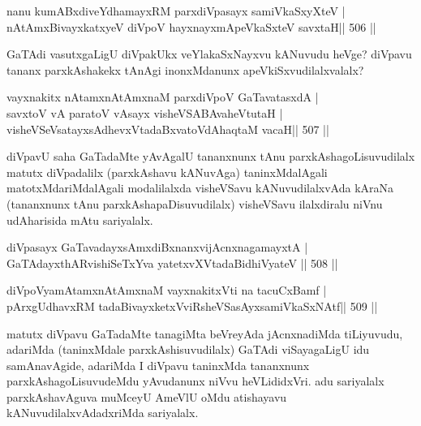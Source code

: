 \begin{shl}
nanu kumABxdiveYdhamayxRM parxdiVpasayx samiVkaSxyXteV | \\
nA\s \s tAmxBivayxkatxyeV diVpoV hayxnayxmApeVkaSxteV savxtaH\hfill ||  506 ||  
\end{shl}

\begin{artha}
GaTAdi  vasutxgaLigU diVpakUkx veYlakaSxNayxvu kANuvudu heVge? diVpavu tananx parxkAshakekx tAnAgi inonxMdanunx apeVkiSxvudilalxvalalx? 
\end{artha}


\begin{shl}
vayxnakitx nA\s \s tamxnA\s \s tAmxnaM parxdiVpoV GaTavatasxdA | \\
\footnotemark[1]savxtoV vA paratoV vA\s sayx visheVSABAvaheVtutaH | \\
visheVSeV\s satayxsAdhevxVtadaBxvatoVdAhaqtaM vacaH\hfill ||  507 ||  
\end{shl}

\begin{artha}
diVpavU saha GaTadaMte yAvAgalU tananxnunx tAnu parxkAshagoLisuvudilalx matutx diVpadalilx (parxkAshavu kANuvAga) taninxMdalAgali matotxMdariMdalAgali modalilalxda visheVSavu kANuvudilalxvAda kAraNa (tananxnunx tAnu parxkAshapaDisuvudilalx) visheVSavu ilalxdiralu niVnu udAharisida mAtu sariyalalx.
\end{artha}

\begin{shl}
diVpasayx GaTavadayxsAmxdiBxnanxvijAcnxnagamayxtA | \\
GaTAdayxthARvishiSeTxYva yatetxvXVtadaBidhiVyateV \hfill||  508 ||  
\end{shl}
				
\begin{shl}
diVpoV\s yamAtamxnA\s \s tAmxnaM vayxnakitxVti na tacuCxBamf | \\
pArxgUdhavxRM tadaBivayxketxVviRsheVSasAyxsamiVkaSxNAtf\hfill ||  509 ||  
\end{shl}

\begin{artha}
matutx diVpavu GaTadaMte tanagiMta beVreyAda jAcnxnadiMda tiLiyuvudu, adariMda (taninxMdale parxkAshisuvudilalx) GaTAdi viSayagaLigU idu samAnavAgide, adariMda I diVpavu taninxMda tananxnunx parxkAshagoLisuvudeMdu yAvudanunx niVvu heVLididxVri. adu sariyalalx parxkAshavAguva muMceyU AmeVlU oMdu atishayavu kANuvudilalxvAdadxriMda sariyalalx.
\end{artha}

